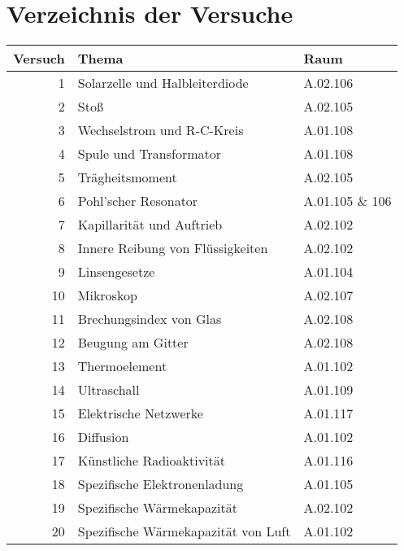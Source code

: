 
\chapter{Verzeichnis der Versuche}

\begin{table}[h!]
 \centering
 \begin{tabular}{rll}
 \hline
 Versuch & Thema & Raum\\
 \hline
 1 & Solarzelle und Halbleiterdiode & A.02.106\\ 
 2 & Stoß & A.02.105\\
 3 & Wechselstrom und R-C-Kreis & A.01.108 \\ 
 4 & Spule und Transformator & A.01.108 \\ 
 5 & Trägheitsmoment & A.02.105\\ 
 6 & Pohl'scher Resonator & A.01.105 \& 106 \\
 7 & Kapillarität und Auftrieb & A.02.102 \\ 
 8 & Innere Reibung von Flüssigkeiten & A.02.102 \\ 
 9 & Linsengesetze & A.01.104 \\ 
 10 & Mikroskop & A.02.107 \\ 
 11 & Brechungsindex von Glas & A.02.108 \\ 
 12 & Beugung am Gitter & A.02.108\\ 
 13 & Thermoelement & A.01.102 \\ 
 14 & Ultraschall & A.01.109\\
 15 & Elektrische Netzwerke & A.01.117 \\ 
 16 & Diffusion & A.01.102\\ 
 17 & Künstliche Radioaktivität & A.01.116 \\ 
 18 & Spezifische Elektronenladung & A.01.105 \\ 
 19 & Spezifische Wärmekapazität & A.02.102 \\ 
 20 & Spezifische Wärmekapazität von Luft & A.01.102 \\ 
 \hline
 \end{tabular}
\end{table}
  
